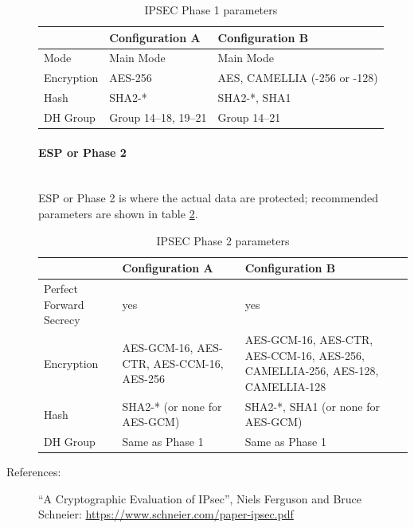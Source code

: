 \begin{description}
\begin{table}[h]
  \centering
  \small
  \begin{tabular}{lll}
    \toprule
    & Configuration A & Configuration B \\
    \midrule
    Mode & Main Mode & Main Mode \\
    Encryption & AES-256 & AES, CAMELLIA (-256 or -128) \\
    Hash & SHA2-* & SHA2-*, SHA1 \\
    DH Group & Group 14--18, 19--21 & Group 14--21 \\
    \bottomrule
  \end{tabular}
  \caption{IPSEC Phase 1 parameters}
  \label{tab:IPSEC_ph1_params}
\end{table}

\paragraph*{ESP or Phase 2}\mbox{}\\

ESP or Phase 2 is where the actual data are protected; recommended
parameters are shown in table \ref{tab:IPSEC_ph2_params}.

\begin{table}[h]
  \centering
  \small
  \begin{tabular}{lll}
    \toprule
    & Configuration A & Configuration B \\
    \midrule
    Perfect Forward Secrecy & yes & yes \\
    Encryption & 
    \parbox[t]{5cm}{\raggedright
    \mbox{AES-GCM-16}, \mbox{AES-CTR}, \mbox{AES-CCM-16}, \mbox{AES-256}}
    &
    \parbox[t]{5cm}{\raggedright
    \mbox{AES-GCM-16}, \mbox{AES-CTR}, \mbox{AES-CCM-16}, \mbox{AES-256}, \mbox{CAMELLIA-256}, \mbox{AES-128}, \mbox{CAMELLIA-128}} \\
    Hash & SHA2-* (or none for AES-GCM) & SHA2-*, SHA1 (or none for AES-GCM) \\
    DH Group & Same as Phase 1 & Same as Phase 1 \\
    \bottomrule
  \end{tabular}
  \caption{IPSEC Phase 2 parameters}
  \label{tab:IPSEC_ph2_params}
\end{table}

\item[References:] \mbox{}

``A Cryptographic Evaluation of IPsec'', Niels Ferguson and Bruce
  Schneier: \url{https://www.schneier.com/paper-ipsec.pdf}

\end{description}


